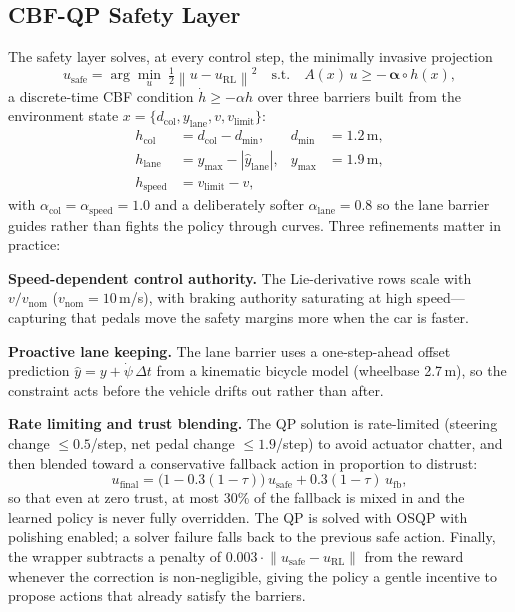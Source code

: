 \documentclass[conference]{IEEEtran}
\begin{document}
\subsection{CBF-QP Safety Layer}
The safety layer solves, at every control step, the minimally invasive projection
\begin{equation}
u_{\mathrm{safe}} = \arg\min_{u}\ \tfrac{1}{2}\left\lVert u - u_{\mathrm{RL}} \right\rVert^2
\quad \text{s.t.} \quad A(x)\, u \geq -\,\boldsymbol{\alpha} \circ h(x),
\label{eq:qp}
\end{equation}
a discrete-time CBF condition $\dot h \geq -\alpha h$ \cite{ames2017cbf} over three barriers built from the environment state $x = \{d_{\mathrm{col}}, y_{\mathrm{lane}}, v, v_{\mathrm{limit}}\}$:
\begin{align}
h_{\mathrm{col}} &= d_{\mathrm{col}} - d_{\min}, & d_{\min} &= 1.2\,\mathrm{m},\\
h_{\mathrm{lane}} &= y_{\max} - |\hat y_{\mathrm{lane}}|, & y_{\max} &= 1.9\,\mathrm{m},\\
h_{\mathrm{speed}} &= v_{\mathrm{limit}} - v, &&
\end{align}
with $\alpha_{\mathrm{col}} = \alpha_{\mathrm{speed}} = 1.0$ and a deliberately softer $\alpha_{\mathrm{lane}} = 0.8$ so the lane barrier guides rather than fights the policy through curves. Three refinements matter in practice:

\textbf{Speed-dependent control authority.} The Lie-derivative rows scale with $v / v_{\mathrm{nom}}$ ($v_{\mathrm{nom}} = 10$\,m/s), with braking authority saturating at high speed---capturing that pedals move the safety margins more when the car is faster.

\textbf{Proactive lane keeping.} The lane barrier uses a one-step-ahead offset prediction $\hat y = y + \dot\psi\, \Delta t$ from a kinematic bicycle model (wheelbase 2.7\,m), so the constraint acts before the vehicle drifts out rather than after.

\textbf{Rate limiting and trust blending.} The QP solution is rate-limited (steering change $\leq 0.5$/step, net pedal change $\leq 1.9$/step) to avoid actuator chatter, and then blended toward a conservative fallback action in proportion to distrust:
\begin{equation}
u_{\mathrm{final}} = \big(1 - 0.3(1-\tau)\big)\, u_{\mathrm{safe}} + 0.3 (1-\tau)\, u_{\mathrm{fb}},
\label{eq:blend}
\end{equation}
so that even at zero trust, at most 30\% of the fallback is mixed in and the learned policy is never fully overridden. The QP is solved with OSQP \cite{stellato2020osqp} with polishing enabled; a solver failure falls back to the previous safe action. Finally, the wrapper subtracts a penalty of $0.003 \cdot \lVert u_{\mathrm{safe}} - u_{\mathrm{RL}} \rVert$ from the reward whenever the correction is non-negligible, giving the policy a gentle incentive to propose actions that already satisfy the barriers.
\end{document}
